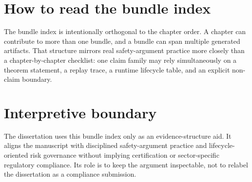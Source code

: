 \section{How to read the bundle index}
The bundle index is intentionally orthogonal to the chapter order. A chapter can contribute
to more than one bundle, and a bundle can span multiple generated artifacts. That structure
mirrors real safety-argument practice more closely than a chapter-by-chapter checklist: one
claim family may rely simultaneously on a theorem statement, a replay trace, a runtime
lifecycle table, and an explicit non-claim boundary.

\section{Interpretive boundary}
The dissertation uses this bundle index only as an evidence-structure aid. It aligns the
manuscript with disciplined safety-argument practice and lifecycle-oriented risk governance
without implying certification or sector-specific regulatory compliance. Its role is to keep
the argument inspectable, not to relabel the dissertation as a compliance submission.
